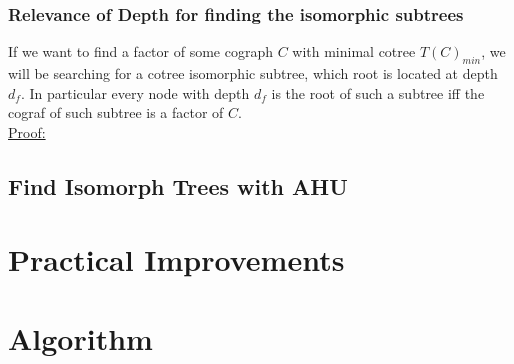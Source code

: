 \documentclass[a4paper,12pt]{article}
\begin{document}
		\subsubsection{Relevance of Depth for finding the isomorphic subtrees}
			If we want to find a factor of some cograph $C$ with minimal cotree $T(C)_{min}$, we will be searching for a cotree isomorphic subtree, which root is located at depth $d_f$. In particular every node with depth $d_f$ is the root of such a subtree iff the cograf of such subtree is a factor of $C$.\\
			\underline{Proof:}
			
	\subsection{Find Isomorph Trees with AHU}
	\section{Practical Improvements}
	\section{Algorithm}
\end{document}
